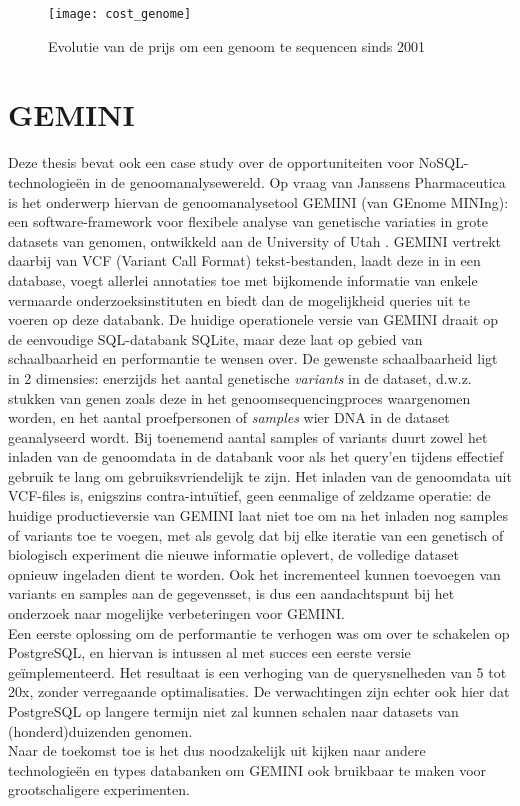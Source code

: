 \begin{figure}[h!]
\texttt{[image: cost\_genome]}
\caption{Evolutie van de prijs om een genoom te sequencen sinds 2001}
\label{sequencing_cost}
\end{figure}

\section{GEMINI}

Deze thesis bevat ook een case study over de opportuniteiten voor NoSQL-technologie\"en in de genoomanalysewereld. Op vraag van Janssens Pharmaceutica is het onderwerp hiervan de genoomanalysetool GEMINI (van GEnome MINIng): een software-framework voor flexibele analyse van genetische variaties in grote datasets van genomen, ontwikkeld aan de University of Utah \cite{10.1371/journal.pcbi.1003153}. GEMINI vertrekt daarbij van VCF (Variant Call Format) tekst-bestanden, laadt deze in in een database, voegt allerlei annotaties toe met bijkomende informatie van enkele vermaarde onderzoeksinstituten en biedt dan de mogelijkheid queries uit te voeren op deze databank. De huidige operationele versie van GEMINI draait op de eenvoudige SQL-databank SQLite, maar deze laat op gebied van schaalbaarheid en performantie te wensen over. De gewenste schaalbaarheid ligt in 2 dimensies: enerzijds het aantal genetische \textit{variants} in de dataset, d.w.z. stukken van genen zoals deze in het genoomsequencingproces waargenomen worden, en het aantal proefpersonen of \textit{samples} wier DNA in de dataset geanalyseerd wordt. Bij toenemend 
aantal samples of variants duurt zowel het inladen van de genoomdata in de databank voor als het query'en tijdens effectief gebruik te lang om gebruiksvriendelijk te zijn. Het inladen van de genoomdata uit VCF-files is, enigszins contra-intu\"itief, geen eenmalige of zeldzame operatie: de huidige productieversie van GEMINI laat niet toe om na het inladen nog samples of variants toe te voegen, met als gevolg dat bij elke iteratie van een genetisch of biologisch experiment die nieuwe informatie oplevert, de volledige dataset opnieuw ingeladen dient te worden. Ook het incrementeel kunnen toevoegen van variants en samples aan de gegevensset, is dus een aandachtspunt bij het onderzoek naar mogelijke verbeteringen voor GEMINI.\\
Een eerste oplossing om de performantie te verhogen was om over te schakelen op PostgreSQL, en hiervan is intussen al met succes een eerste versie ge\"implementeerd. Het resultaat is een verhoging van de querysnelheden van 5 tot 20x, zonder verregaande optimalisaties. De verwachtingen zijn echter ook hier dat PostgreSQL op langere termijn niet zal kunnen schalen naar datasets van (honderd)duizenden genomen.\\
Naar de toekomst toe is het dus noodzakelijk uit kijken naar andere technologie\"en en types databanken om GEMINI ook bruikbaar te maken voor grootschaligere experimenten.




